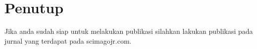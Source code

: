 \chapter{Penutup}

Jika anda sudah siap untuk melakukan publikasi silahkan lakukan publikasi pada jurnal yang terdapat pada scimagojr.com.